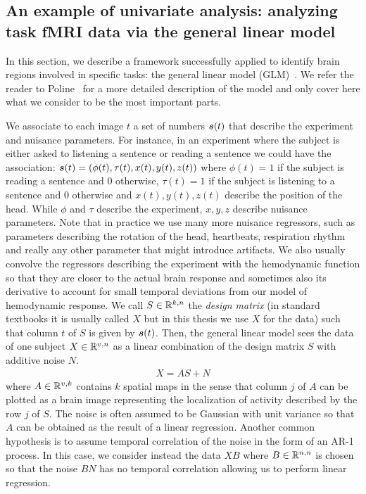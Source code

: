 \subsection{An example of univariate analysis: analyzing task fMRI data via the general linear model}
\label{sec:glm}
In this section, we describe a framework successfully applied to identify brain regions involved in specific tasks: the general linear model
(GLM)~\cite{friston1995analysis}. We refer the reader to
Poline~\cite{poline2012general} for a more detailed description of the model and only cover here what we consider to be the most important parts.

We associate to each image $t$ a set of numbers $\boldsymbol{s}(t)$ that describe the experiment and
nuisance parameters.
For instance, in an experiment where the subject is either asked to listening a
sentence or reading a sentence we could have the association: $\boldsymbol{s}(t) = (\phi(t), \tau(t), x(t), y(t),
z(t))$ where $\phi(t)=1$ if the subject is reading a sentence and $0$ otherwise, $\tau(t)=1$
if the subject is listening to a sentence and $0$ otherwise and  $x(t), y(t), z(t)$ describe the
position of the head. While $\phi$ and $\tau$ describe the experiment, $x, y, z$
describe nuisance parameters.
Note that in practice we use many more nuisance regressors, such
as parameters describing the rotation of the head, heartbeats, respiration
rhythm and really any other parameter that might introduce artifacts. We also
usually convolve the regressors describing the experiment with the hemodynamic
function so that they are closer to the actual brain response and sometimes also its derivative to account for small temporal deviations from our model of hemodynamic response.
We call $S \in \mathbb{R}^{k, n}$ the \emph{design matrix} (in standard textbooks it is
usually called $X$ but in this thesis we use $X$ for the data) such that column
$t$ of $S$ is given by $\boldsymbol{s}(t)$.
Then, the general linear model sees the data of one subject $X \in \mathbb{R}^{v, n}$ as a linear combination of the
design matrix $S$ with additive noise $N$.
\begin{align}
X = A S + N
\end{align}
where $A \in \mathbb{R}^{v, k}$ contains $k$ spatial maps in the sense that column $j$
of $A$ can be plotted as a brain image representing the localization of activity
described by the row $j$ of $S$.
The noise is often assumed to be Gaussian with unit variance so that $A$ can be obtained as the
result of a linear regression. Another common hypothesis is to assume temporal
correlation of the noise in the form of an AR-1 process. In this case, we 
consider instead the data $XB$ where $B \in \mathbb{R}^{n, n}$ is chosen so that the
noise $BN$ has no temporal correlation allowing us to perform linear regression.


